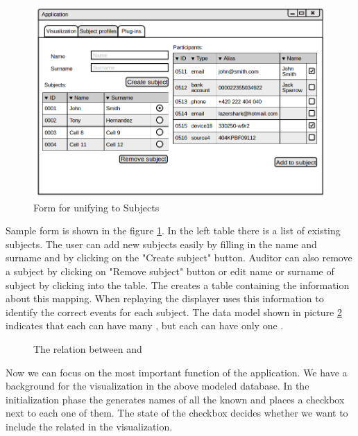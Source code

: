 \begin{figure}[h]
	\begin{center} 
	\includegraphics[width=1.0\textwidth]{./img/GUI/Subject_profiles.png}
	\end{center}
	\caption{Form for unifying  to Subjects}\label{form}
\end{figure}

Sample form is shown in the figure \ref{form}. In the left table there is a list of existing subjects. The user can add new subjects easily by filling in the name and surname and by clicking on the "Create subject" button. Auditor can also remove a subject by clicking on "Remove subject" button or edit name or surname of subject by clicking into the table. The  creates a table containing the information about this mapping. When replaying the displayer uses this information to identify the correct events for each subject. The data model shown in picture \ref{model-displayer} indicates that each  can have many , but each  can have only one .

\begin{figure}[!h]
    \centering 
    
    \epsfysize=40mm 
    \caption{The relation between  and }\label{model-displayer}
\end{figure}

Now we can focus on the most important function of the application. We have a background for the visualization in the above modeled database. In the initialization phase the  generates names of all the known  and places a checkbox next to each one of them. The state of the checkbox decides whether we want to include the related  in the visualization. 

